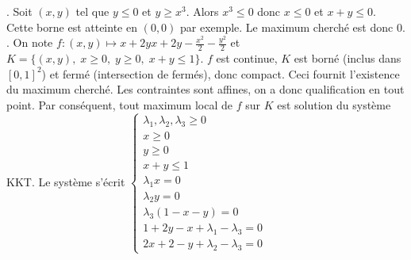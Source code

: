 \documentclass{report}
\begin{document}
\subsection{} \noindent{}\\ 
\\ 
\\
. Soit $(x,y)$ tel que $y\leq 0$ et $y\geq x^3$. Alors $x^3\leq 0$ donc $x\leq 0$ et $x+y\leq 0$. Cette borne est atteinte en $(0,0)$ par exemple. Le maximum cherché est donc $0$.\newline
{}. On note $f:(x,y)\mapsto x + 2yx + 2y -\frac{x^2}2 - \frac{y^2}{2}$ et $K=\{(x,y),\;x\geq 0,\; y\geq 0,\; x+y\leq 1\}$. $f$ est continue, $K$ est borné (inclus dans $[0,1]^2$) et fermé (intersection de fermés), donc compact. Ceci fournit l'existence du maximum cherché.\newline
Les contraintes sont affines, on a donc qualification en tout point. Par conséquent, tout maximum local de $f$ sur $K$ est solution du système KKT.\newline
Le système s'écrit $\begin{cases}
\lambda_1,\lambda_2,\lambda_3\geq 0 \\
x\geq 0\\
y\geq 0 \\
x+y\leq 1\\
\lambda_1 x =0\\
\lambda_2 y=0\\
\lambda_3 (1-x-y) = 0\\
1+2y-x+\lambda_1-\lambda_3 = 0\\
2x+2-y+\lambda_2-\lambda_3 = 0
\end{cases}$\newline
\end{document}

